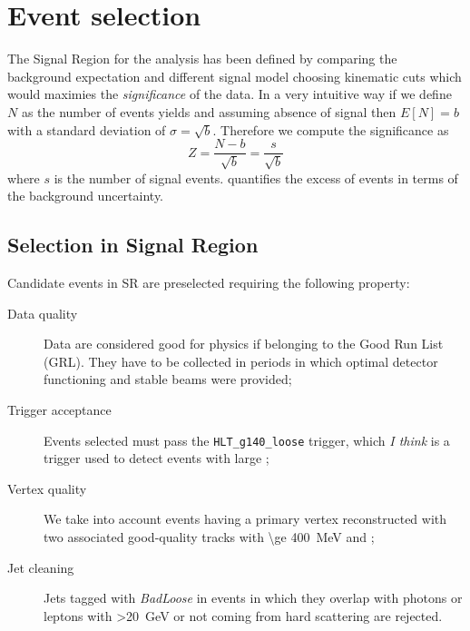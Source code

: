 \section{Event selection}
\label{sec:SRselection}
The Signal Region for the \mph analysis has been defined by comparing the background expectation and different signal model choosing kinematic cuts which would maximies the \emph{significance} of the data. In a very intuitive way if we define $N$ as the number of events yields and assuming absence of signal then $E[N]=b$ with a standard deviation of $\sigma = \sqrt{b}$. Therefore we compute the significance as
\begin{equation}
  Z=\frac{N-b}{\sqrt{b}}=\frac{s}{\sqrt{b}}
  \label{eqn:significance}
\end{equation}
where $s$ is the number of signal events. \Eqn{\ref{eqn:significance}} quantifies the excess of events in terms of the background uncertainty.

\subsection{Selection in Signal Region}
Candidate events in SR are preselected requiring the following property:
\begin{description}
\item [Data quality] Data are considered good for physics if belonging to the Good Run List (GRL). They have to be collected in periods in which optimal detector functioning and stable beams were provided;
\item [Trigger acceptance] Events selected must pass the  \verb!HLT_g140_loose! trigger, which {\itshape I think} is a trigger used to detect events with large \met; 
\item [Vertex quality] We take into account events having a primary vertex reconstructed with two associated good-quality tracks with \pt \SI{\ge 400}{\MeV} and ;
\item [Jet cleaning] Jets tagged with {\itshape BadLoose}  in events in which they overlap with photons or leptons with \pt \SI{>20}{\GeV} or not coming from hard scattering are rejected.
\end{description}


